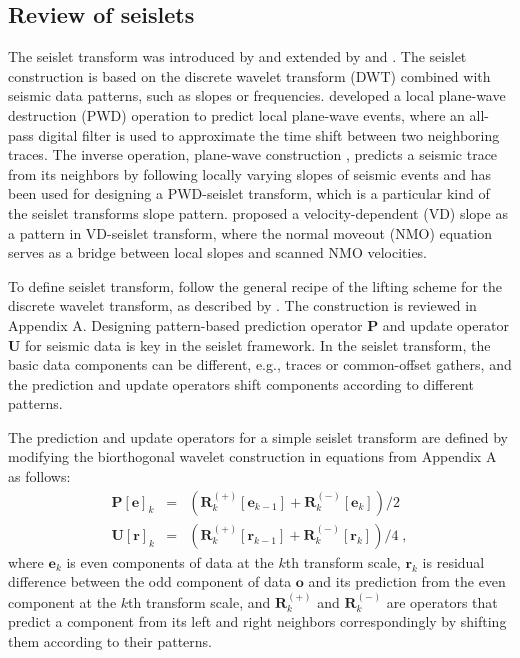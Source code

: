 \subsection{Review of seislets}
The seislet transform was introduced by \cite{Fomel06} and extended by
\cite{Fomel10a} and \cite{Liu10}. The seislet construction is based on 
the discrete wavelet transform (DWT) combined with seismic data
patterns, such as  slopes or frequencies. \cite{Fomel02} developed a
local plane-wave destruction (PWD) operation to predict local
plane-wave events, where an all-pass digital filter is used to
approximate the time shift between two neighboring traces. The inverse
operation, plane-wave construction \cite[]{Fomel06b,Fomel10b},
predicts a seismic trace from its neighbors by following locally
varying slopes of seismic events and has been used for designing a
PWD-seislet transform, which is a particular kind of the seislet
transforms   slope pattern. \cite{Liu13} proposed a
velocity-dependent (VD) slope as a pattern in VD-seislet transform,
where the normal moveout (NMO) equation serves as a bridge between
local slopes and scanned NMO velocities.

To define seislet transform,   follow the general recipe of the
lifting scheme for the discrete wavelet transform, as described by
\cite{athome}. The construction is reviewed in Appendix A. 
Designing pattern-based prediction operator $\mathbf{P}$ and update
operator $\mathbf{U}$ for seismic data is key in the seislet
framework. In the seislet transform, the basic data components can be
different, e.g., traces or common-offset gathers, and the prediction
and update operators shift components according to different patterns.

The prediction and update operators for a simple seislet transform are
defined by modifying the biorthogonal wavelet construction in
equations from Appendix A as follows:
\begin{eqnarray}
  \label{eq:sp}
  \mathbf{P[e]}_k & = & \left(\mathbf{R}_k^{(+)}[\mathbf{e}_{k-1}] + 
  \mathbf{R}_k^{(-)}[\mathbf{e}_{k}]\right)/2 \\
  \label{eq:su}
  \mathbf{U[r]}_k & = & \left(\mathbf{R}_k^{(+)}[\mathbf{r}_{k-1}] + 
    \mathbf{R}_k^{(-)}[\mathbf{r}_{k}]\right)/4\;,
\end{eqnarray}
where $\mathbf{e}_k$ is even components of data at the $k$th transform
scale, $\mathbf{r}_k$ is residual difference between the odd component
of data $\mathbf{o}$ and its prediction from the even component at the
$k$th transform scale,  and
$\mathbf{R}_k^{(+)}$ and $\mathbf{R}_k^{(-)}$ are operators that
predict a component from its left and right neighbors correspondingly
by shifting them according to their patterns. 

